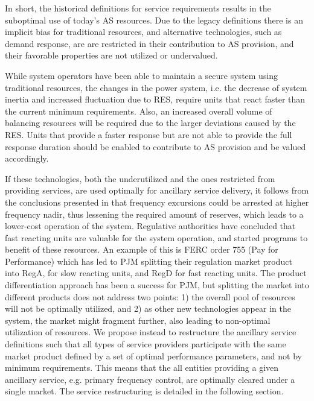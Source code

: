 In short, the historical definitions for service requirements results in the suboptimal use of today's AS resources. Due to the legacy definitions there is an implicit %
bias for traditional resources, and alternative technologies, such as demand response, are are restricted in their contribution to AS provision, and their favorable properties are not utilized or undervalued.

While system operators have been able to maintain a secure system using traditional resources, the changes in the power system, i.e. the decrease of system inertia and increased fluctuation due to RES, require units that react faster than the current minimum requirements. Also, an increased overall volume of balancing resources will be required due to the larger deviations caused by the RES.
Units that provide a faster response but are not able to provide the full response duration should be enabled to contribute to AS provision and be valued accordingly.

If these technologies, both the underutilized and the ones restricted from providing services, are used optimally for ancillary service delivery, it follows from the conclusions presented in \cite{makarov2008assessing,vrettos2015integrating} that frequency excursions could be arrested at higher frequency nadir, thus lessening the required amount of reserves, which leads to a lower-cost operation of the system. 
Regulative authorities have concluded that fast reacting units are valuable for the system operation, and started programs to benefit of these resources. An example of this is FERC order 755 (Pay for Performance) which has led to PJM splitting their regulation market product into RegA, for slow reacting units, and RegD for fast reacting units. The product differentiation approach has been a success for PJM, but splitting the market into different products does not address two points: 1) the overall pool of resources will not be optimally utilized, and 2) as other new technologies appear in the system, the market might fragment further, also leading to non-optimal utilization of resources.  We propose instead to restructure the ancillary service definitions such that all types of service providers participate with the same market product defined by a set of optimal performance parameters, and not by minimum requirements. This means that the all entities providing a given ancillary service, e.g. primary frequency control, are optimally cleared under a single market. The service restructuring is detailed in the following section.
